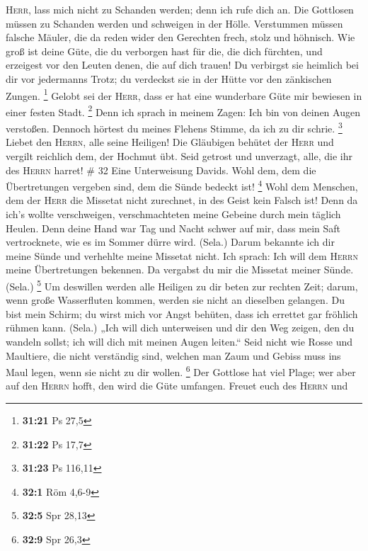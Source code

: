 \textsc{Herr}, lass mich nicht zu Schanden werden; denn ich rufe dich
an. Die Gottlosen müssen zu Schanden werden und schweigen in der Hölle.
 Verstummen müssen falsche Mäuler, die da reden wider den
Gerechten frech, stolz und höhnisch.  Wie groß ist deine
Güte, die du verborgen hast für die, die dich fürchten, und erzeigest
vor den Leuten denen, die auf dich trauen!  Du verbirgst
sie heimlich bei dir vor jedermanns Trotz; du verdeckst sie in der Hütte
vor den zänkischen Zungen. \footnote{\textbf{31:21} Ps 27,5}
 Gelobt sei der \textsc{Herr}, dass er hat eine
wunderbare Güte mir bewiesen in einer festen Stadt. \footnote{\textbf{31:22}
  Ps 17,7}  Denn ich sprach in meinem Zagen: Ich bin von
deinen Augen verstoßen. Dennoch hörtest du meines Flehens Stimme, da ich
zu dir schrie. \footnote{\textbf{31:23} Ps 116,11} 
Liebet den \textsc{Herrn}, alle seine Heiligen! Die Gläubigen behütet
der \textsc{Herr} und vergilt reichlich dem, der Hochmut übt.
 Seid getrost und unverzagt, alle, die ihr des
\textsc{Herrn} harret! \# 32  Eine Unterweisung Davids.
Wohl dem, dem die Übertretungen vergeben sind, dem die Sünde bedeckt
ist! \footnote{\textbf{32:1} Röm 4,6-9}  Wohl dem
Menschen, dem der \textsc{Herr} die Missetat nicht zurechnet, in des
Geist kein Falsch ist!  Denn da ich's wollte verschweigen,
verschmachteten meine Gebeine durch mein täglich Heulen. 
Denn deine Hand war Tag und Nacht schwer auf mir, dass mein Saft
vertrocknete, wie es im Sommer dürre wird. (Sela.)  Darum
bekannte ich dir meine Sünde und verhehlte meine Missetat nicht. Ich
sprach: Ich will dem \textsc{Herrn} meine Übertretungen bekennen. Da
vergabst du mir die Missetat meiner Sünde. (Sela.) \footnote{\textbf{32:5}
  Spr 28,13}  Um deswillen werden alle Heiligen zu dir
beten zur rechten Zeit; darum, wenn große Wasserfluten kommen, werden
sie nicht an dieselben gelangen.  Du bist mein Schirm; du
wirst mich vor Angst behüten, dass ich errettet gar fröhlich rühmen
kann. (Sela.)  „Ich will dich unterweisen und dir den Weg
zeigen, den du wandeln sollst; ich will dich mit meinen Augen leiten.``
 Seid nicht wie Rosse und Maultiere, die nicht verständig
sind, welchen man Zaum und Gebiss muss ins Maul legen, wenn sie nicht zu
dir wollen. \footnote{\textbf{32:9} Spr 26,3}  Der
Gottlose hat viel Plage; wer aber auf den \textsc{Herrn} hofft, den wird
die Güte umfangen.  Freuet euch des \textsc{Herrn} und
